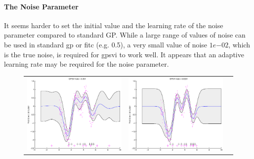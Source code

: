 \documentclass{article} %
\begin{document}
\noindent \paragraph{The Noise Parameter} It seems harder to set the initial value and the learning rate of the noise parameter compared to standard GP. 
While a large range of values of noise can be used in standard gp or fitc (e.g. 0.5), a very small value of noise $1e{-02}$, which is the true noise, is required for gpsvi to work well.
It appears that an adaptive learning rate may be required for the noise parameter.

\begin{figure}
\centering
\begin{tabular}{ccc}
\includegraphics[scale=0.3]{figures/func1-svi-lrate1e-03.eps} &
\includegraphics[scale=0.3]{figures/func1-svi-lrate1e-04.eps} &

\end{tabular}
\end{figure}
\end{document}

